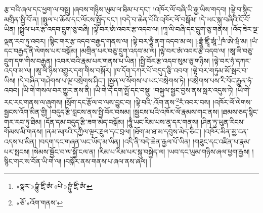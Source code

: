 རྩ་བའི་ཞལ་དང་ཕྱག་ལ་བསྡུ། །ཞབས་གཉིས་ཡུམ་ལ་ཐིམ་པ་དང་། །འཁོར་ལོ་བཞི་ཡི་རྒྱ་ཡིས་གདབ། །ལྟེ་བ་སྙིང་མགྲིན་སྤྱི་བོ་ན། །སྤྲུལ་པ་ཆོས་དང་ལོངས་སྤྱོད་དང་། །བདེ་བ་ཆེན་པོའི་འཁོར་ལོ་བསྒོམ། །དེ་ཡང་སྐུ་བཞིའི་ངོ་བོ་ཡིན། །སྤྲུལ་པར་རྩ་འདབ་དྲུག་ཅུ་བཞི། །ལྟེ་བར་ཨཾ་འབར་རྩ་འདབ་ལ། །ཀཱ་ལི་བཞི་དང་དྲུག་ཅུ་གནས། །འོད་ཟེར་ལྔ་ལྡན་རབ་ཏུ་འབར། །སྙིང་གར་རྩ་འདབ་བརྒྱད་གནས་ལ། །ལྟེ་བར་ཧཱུྃ་ནག་འདབ་མ་ལ། །:བྷྲཱུཾ་ཛྲཱིཾ་ཨཱཾ་\footnote{«སྣར་»བྷུཾ་ཛྲིཾ་ཨཾ་«པེ་»བྷྲུཾ་ཛྲིཾ་ཨཾ་}ཁཾ་ཨེ་ཝཾ་མ། །ཡཾ་དང་བརྒྱད་ནི་ལེགས་པར་བསྒོམ། །མགྲིན་པར་བཅུ་དྲུག་འདབ་མ་ལ། །ལྟེ་བར་ཨཾ་འབར་རྩ་འདབ་ལ། །ཨཱ་ལི་བཅུ་དྲུག་དག་གིས་བརྒྱན། །འབར་བའི་རྣམ་པར་གནས་པ་ཡིན། །སྤྱི་བོར་རྩ་འདབ་སུམ་ཅུ་གཉིས། །ལྟེ་བར་ཧཾ་དཀར་འདབ་མ་ལ། །ཨཱ་ལི་ཉིས་འགྱུར་དག་གིས་བསྐོར། །ཁ་དོག་དཀར་པོ་བདུད་རྩི་འབབ། །ལྟེ་བར་གཏུམ་མོ་སྦར་བ་ཡིས། །དེ་བཞིན་གཤེགས་པ་ལྔ་བསྲེགས་ཤིང་། །སྤྱན་ལ་སོགས་པ་ཡང་བསྲེགས་ཏེ། །བསྲེགས་པས་རི་བོང་རྒྱུན་ཧཾ་འབབ། །ཡི་གེ་གསལ་བར་གྱུར་ནས་ནི། །ཡི་གེ་དེ་དག་སྤྲོ་དང་བསྡུ། །བསྐུལ་སྦྱང་བྱས་ནས་སླར་འདུས་ཏེ། །ཡི་གེ་རང་རང་གནས་ལ་ཞུགས། །སྲོག་དང་རྩོལ་བ་ལས་བྱུང་བ། །ལྟེ་བའི་:འོག་ནས་\footnote{«ཅོ་»འོག་གནས་}རཾ་འབར་བས། །འཁོར་ལོ་ལེགས་སྦྱངས་འོག་མིན་གྱི། །བདུད་རྩི་བླངས་ནས་སྤྱི་བོར་བསམ། །སྦྱངས་པའི་འཁོར་ལོ་རྣམས་གང་ནས། །ཐམས་ཅད་སྙིང་གར་རབ་ཏུ་ཐིམ། །དོན་དམ་བདུད་རྩི་ཟག་མེད་བསྒོམ། །ཧཱུྃ་ཡང་རིམ་པས་ནཱ་དར་གནས། །ཤིན་ཏུ་ཡུན་རིངས་གོམས་མི་གནས། །ནམ་མཁའི་དཀྱིལ་ལྟར་རྔུལ་དང་བྲལ། །ཐོག་མ་ཐ་མ་དབུས་མེད་ཅིང་། །འཁོར་མིན་མྱ་ངན་འདས་པ་མིན། །བདག་དང་གཞན་ཡང་ཡོད་མ་ཡིན། །འདི་ནི་བདེ་ཆེན་རྒྱལ་པོ་ཡིན། །གཟུང་དང་འཛིན་པ་རྣམ་པར་སྤངས། །སེམས་སྦྱོང་བ་ལ་སྐྱོ་ངལ་ན། །རིམ་པ་རིམ་པར་སྐུ་བསྐྱེད་ལ། །ཡབ་དང་ཡུམ་གཉིས་ཞལ་ཕྱག་རྒྱས། །སྙིང་གར་ས་བོན་ཡི་གེ་ལ། །བསྐོར་ནས་གནས་པ་ཞལ་ནས་ཞལ། །

